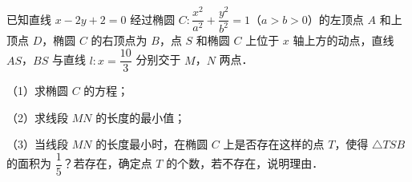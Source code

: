 \begingroup
\renewenvironment{question}{\Needspace{0.5\textheight}}{}
\begin{question}
已知直线 $x-2y+2=0$ 经过椭圆 $C:\dfrac{x^2}{a^2}+\dfrac{y^2}{b^2}=1$（$a>b>0$）的左顶点 $A$ 和上顶点 $D$，椭圆 $C$ 的右顶点为 $B$，点 $S$ 和椭圆 $C$ 上位于 $x$ 轴上方的动点，直线 $AS$，$BS$ 与直线 $l:x=\dfrac{10}3$ 分别交于 $M$，$N$ 两点．

（1）求椭圆 $C$ 的方程；

（2）求线段 $MN$ 的长度的最小值；

（3）当线段 $MN$ 的长度最小时，在椭圆 $C$ 上是否存在这样的点 $T$，使得 $\triangle TSB$ 的面积为 $\dfrac15$？若存在，确定点 $T$ 的个数，若不存在，说明理由．
\nopagebreak[4]
\begin{center}\end{center}
\nopagebreak[4]

\end{question}
\endgroup